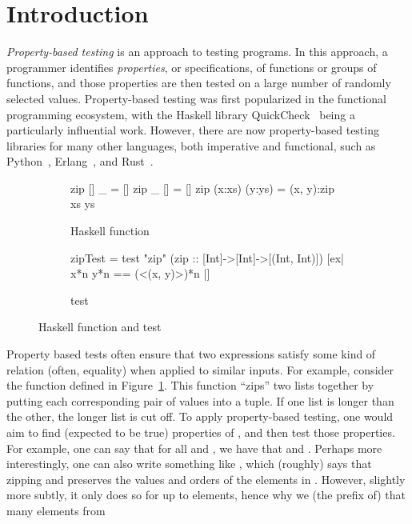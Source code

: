 \section{Introduction} \label{sec:introduction}
\textit{Property-based testing} is an approach to testing programs.
In this approach,
a programmer identifies
\textit{properties}, or specifications,
of functions or groups of functions,
and those properties are then tested on
a large number of randomly selected values.
Property-based testing was first popularized in
the functional programming ecosystem,
with the Haskell library QuickCheck~\cite{claessen2000quickcheck}
being a particularly influential work.
However, there are now property-based testing libraries
for many other languages, both imperative and functional,
such as Python~\cite{maciver2019hypothesis},
Erlang~\cite{arts2008testing},
and
Rust~\cite{derbenwick2025property}.
\begin{figure}
\begin{subfigure}[t]{1\linewidth}
\begin{smallhskcode}
zip [] _ = []
zip _ [] = []
zip (x:xs) (y:ys) = (x, y):zip xs ys
\end{smallhskcode}
\caption{Haskell  function}
\label{fig:zip-code}
\end{subfigure}

\begin{subfigure}[t]{1\linewidth}
\begin{numsmallhskcode}
zipTest = test "zip" (zip :: [Int]->[Int]->[(Int, Int)]) 
      [ex| { x*{n} } { y*{n} } == (<(x, y)>)*{n} |]
\end{numsmallhskcode}
\caption{ \ourDSL test}
\label{fig:zip-test}
\end{subfigure}
\caption{Haskell  function and test}
\label{fig:zip-example}
\end{figure}

Property based tests
often ensure that two expressions satisfy some kind of relation
(often, equality)
when applied to similar inputs.
For example,
consider the  function defined in
Figure~\ref{fig:zip-code}.
This function ``zips'' two lists together
by putting each corresponding pair of values into a tuple.
If one list is longer than the other, the longer list is cut off.
To apply property-based testing,
one would aim to find (expected to be true)
properties of ,
and then test those properties.
For example, one can say that for all  and ,
we have that 
and .
Perhaps more interestingly, one can also write something like
,
which (roughly) says that zipping  and 
preserves the values and orders of the elements in .
However, slightly more subtly, it only does so for up to 
elements, hence why we  (the prefix of) that many elements from 

